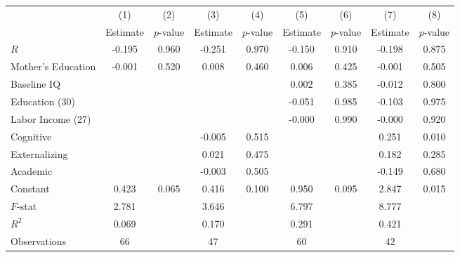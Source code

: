 \begin{tabular}{lcccccccc} \toprule
 & (1) & (2) & (3) & (4) & (5) & (6) & (7) & (8) \\ 
 & Estimate  & $p$-value  & Estimate  & $p$-value  & Estimate  & $p$-value  & Estimate  & $p$-value  \\  \midrule
$R$ &    -0.195 &     0.960 &    -0.251 &     0.970 &    -0.150 &     0.910 &    -0.198 &     0.875 \\  
Mother's Education &    -0.001 &     0.520 &     0.008 &     0.460 &     0.006 &     0.425 &    -0.001 &     0.505 \\  
Baseline IQ &         &         &         &         &     0.002 &     0.385 &    -0.012 &     0.800 \\  
Education (30) &         &         &         &         &    -0.051 &     0.985 &    -0.103 &     0.975 \\  
Labor Income (27) &         &         &         &         &    -0.000 &     0.990 &    -0.000 &     0.920 \\  
Cognitive &         &         &    -0.005 &     0.515 &         &         &     0.251 &     0.010 \\  
Externalizing &         &         &     0.021 &     0.475 &         &         &     0.182 &     0.285 \\  
Academic &         &         &    -0.003 &     0.505 &         &         &    -0.149 &     0.680 \\  
Constant &     0.423 &     0.065 &     0.416 &     0.100 &     0.950 &     0.095 &     2.847 &     0.015 \\  \midrule
$F$-stat &     2.781 &         &     3.646 &         &     6.797 &         &     8.777 &         \\  
$R^2$ &     0.069 &         &     0.170 &         &     0.291 &         &     0.421 &         \\  
Observations &    66 &         &    47 &         &    60 &         &    42 &         \\  
\bottomrule
\end{tabular}

